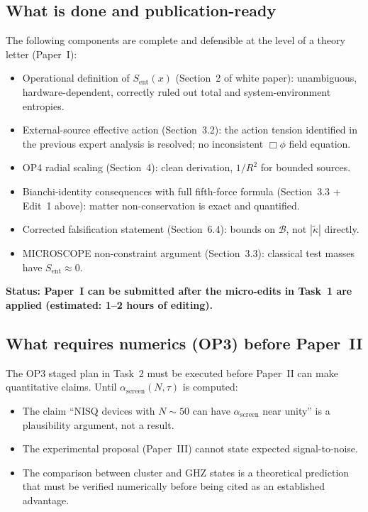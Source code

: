 \documentclass[12pt,letterpaper]{article}
\theoremstyle{plain}
\theoremstyle{definition}
\newcommand{\kt}{\tilde{\kappa}}
\newcommand{\Sent}{S_{\mathrm{ent}}}
\newcommand{\asc}{\alpha_{\mathrm{screen}}}
\newcommand{\Bobs}{\mathcal{B}}
\begin{document}
\subsection{What is done and publication-ready}

The following components are complete and defensible at the level of a theory letter (Paper~I):
\begin{itemize}[noitemsep]
  \item Operational definition of $\Sent(x)$ (Section~2 of white paper): unambiguous, hardware-dependent, correctly ruled out total and system-environment entropies.
  \item External-source effective action (Section~3.2): the action tension identified in the previous expert analysis is resolved; no inconsistent $\Box\phi$ field equation.
  \item OP4 radial scaling (Section~4): clean derivation, $1/R^2$ for bounded sources.
  \item Bianchi-identity consequences with full fifth-force formula (Section~3.3 + Edit~1 above): matter non-conservation is exact and quantified.
  \item Corrected falsification statement (Section~6.4): bounds on $\Bobs$, not $|\kt|$ directly.
  \item MICROSCOPE non-constraint argument (Section~3.3): classical test masses have $\Sent \approx 0$.
\end{itemize}

\textbf{Status: Paper~I can be submitted after the micro-edits in Task~1 are applied (estimated: 1--2 hours of editing).}

\subsection{What requires numerics (OP3) before Paper~II}

The OP3 staged plan in Task~2 must be executed before Paper~II can make quantitative claims.  Until $\asc(N,\tau)$ is computed:
\begin{itemize}[noitemsep]
  \item The claim ``NISQ devices with $N \sim 50$ can have $\asc$ near unity'' is a plausibility argument, not a result.
  \item The experimental proposal (Paper~III) cannot state expected signal-to-noise.
  \item The comparison between cluster and GHZ states is a theoretical prediction that must be verified numerically before being cited as an established advantage.
\end{itemize}
\end{document}

